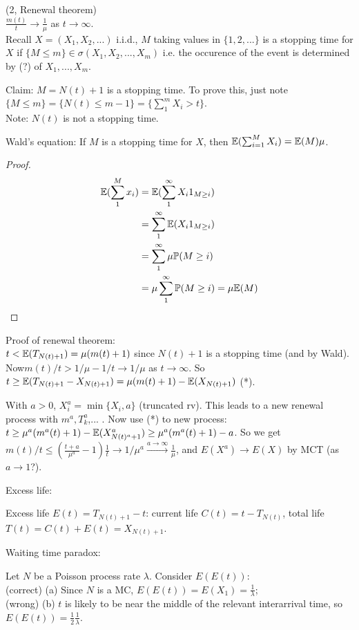 \documentclass[a4paper]{article}
\begin{document}
\begin{thm} (2, Renewal theorem)\\
$\frac{m(t)}{t} \to \frac{1}{\mu}$ as $t \to \infty$.\\
Recall $X = (X_1,X_2,...)$ i.i.d., $M$ taking values in $\{1,2,...\}$ is a stopping time for $X$ if $\{M \leq m\} \in \sigma(X_1,X_2,...,X_m)$ i.e. the occurence of the event is determined by (?) of $X_1,...,X_m$.

Claim: $M=N(t)+1$ is a stopping time. To prove this, just note $\{M \leq m\} = \{N(t) \leq m-1\} = \{\sum_1^m X_i>t\}$.\\
Note: $N(t)$ is not a stopping time.

Wald's equation: If $M$ is a stopping time for $X$, then $\mathbb{E}(\sum_{i=1}^M X_i) = \mathbb{E}(M) \mu$.
\begin{proof}
\begin{equation*}
\begin{aligned}
\mathbb{E}(\sum_1^M x_i) &= \mathbb{E}(\sum_1^\infty X_i 1_{M\geq i})\\
&= \sum_1^\infty \mathbb{E} (X_i 1_{M \geq i} )\\
&= \sum_1^\infty \mu \mathbb{P}(M \geq i)\\
&= \mu \sum_1^\infty \mathbb{P}(M\geq i) = \mu\mathbb{E}(M)
\end{aligned}
\end{equation*}
\end{proof}
Proof of renewal theorem:\\
$t < \mathbb{E}(T_{N(t)+1}) = \mu(m(t)+1)$ since $N(t)+1$ is a stopping time (and by Wald). Now$m(t)/t > 1/\mu - 1/t \to 1/\mu$ as $t \to \infty$. So $t \geq \mathbb{E}(T_{N(t)+1} - X_{N(t)+1}) = \mu(m(t)+1) - \mathbb{E}(X_{N(t)+1})$ (*).

With $a>0$, $X_i^a = \min \{X_i,a\}$ (truncated rv). This leads to a new renewal process with $m^a,T_k^a$,... . Now use (*) to new process: $t \geq \mu^a (m^a (t)+1) - \mathbb{E}(X_{N(t)^a+1}^a ) \geq \mu^a (m^a(t)+1)-a$. So we get $m(t)/t \leq (\frac{t+a}{\mu^a}-1) \frac{1}{t} \to 1/\mu^a \xrightarrow{a \to \infty} \frac{1}{\mu}$, and $E(X^a) \to E(X)$ by MCT (as $a \to 1$?).
\end{thm}

Excess life:

Excess life $E(t) = T_{N(t)+1} - t$: current life $C(t) = t-T_{N(t)}$, total life $T(t) = C(t) + E(t) = X_{N(t)+1}$.

Waiting time paradox:

Let $N$ be a Poisson process rate $\lambda$. Consider $E(E(t))$:\\
(correct) (a) Since $N$ is a MC, $E(E(t)) = E(X_1) = \frac{1}{\lambda}$;\\
(wrong) (b) $t$ is likely to be near the middle of the relevant interarrival time, so $E(E(t)) = \frac{1}{2} \frac{1}{\lambda}$.
\end{document}

